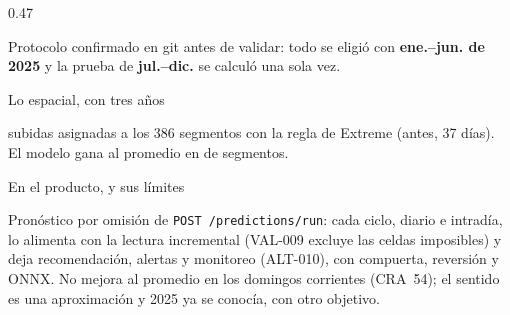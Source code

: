 \documentclass[aspectratio=169,10pt]{beamer}
\newcommand{\titulotarjeta}[1]{{\small\intermedia #1}\par\vspace{2pt}}
\begin{document}
\begin{frame}[t]
\begin{columns}[T]
\begin{column}{0.47\linewidth}
\begin{tarjeta}
Protocolo confirmado en git antes de validar: todo se eligió con \textbf{ene.--jun. de 2025} y la prueba de
\textbf{jul.--dic.} se calculó una sola vez.
\end{tarjeta}
\begin{tarjeta}
\scriptsize\titulotarjeta{Lo espacial, con tres años}
\CortoSubidas{} subidas asignadas a los 386 segmentos con la regla de Extreme (antes, 37 días). El modelo gana al
promedio en \CortoSegGana{} de \CortoSegTotal{} segmentos.
\end{tarjeta}
\begin{tarjeta}
\scriptsize\titulotarjeta{En el producto, y sus límites}
Pronóstico por omisión de \texttt{POST /predictions/run}: cada ciclo, diario e intradía, lo alimenta con la lectura
incremental (VAL-009 excluye las celdas imposibles) y deja recomendación, alertas y monitoreo (ALT-010), con
compuerta, reversión y ONNX. No mejora al promedio en los domingos corrientes (CRA~54); el sentido es una aproximación
y 2025 ya se conocía, con otro objetivo.
\end{tarjeta}
\end{column}
\end{columns}
\end{frame}
\end{document}
